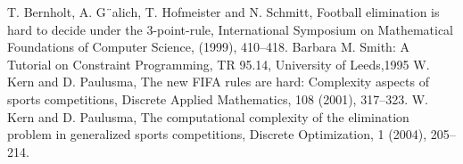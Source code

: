 \documentclass{article}
\begin{document}
	
	\newpage

	\begin{thebibliography}{9}
		T. Bernholt, A. G¨alich, T. Hofmeister and N. Schmitt, Football elimination is hard to decide
		under the 3-point-rule, International Symposium on Mathematical Foundations of Computer
		Science, (1999), 410–418.
		Barbara M. Smith: A Tutorial on Constraint Programming, TR 95.14, University of Leeds,1995
		 W. Kern and D. Paulusma, The new FIFA rules are hard: Complexity aspects of sports competitions, Discrete Applied Mathematics, 108 (2001), 317–323.
		W. Kern and D. Paulusma, The computational complexity of the elimination problem in generalized sports competitions, Discrete Optimization, 1 (2004), 205–214.
	\end{thebibliography}
	
	
\end{document}
